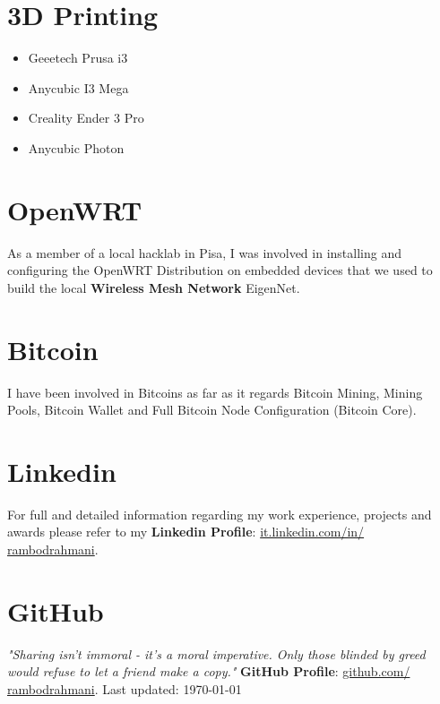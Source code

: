 \documentclass[]{friggeri-cv}
\begin{document}
\begin{aside}\vspace{-2.8cm}
\section{3D Printing \textcolor{red}{\faConnectdevelop}}
\begin{itemize}
	\item Geeetech Prusa i3
	\item Anycubic I3 Mega
	\item Creality Ender 3 Pro
	\item Anycubic Photon
\end{itemize}\vspace{6mm}
\section{OpenWRT \textcolor{green}{\faWifi}}
As a member of a local hacklab in Pisa, I was involved in installing and configuring the OpenWRT Distribution on embedded devices that we used to build the local \textbf{Wireless Mesh Network} EigenNet.\vspace{6mm}
\section{Bitcoin \textcolor{red}{\faBitcoin}}
I have been involved in Bitcoins as far as it regards Bitcoin Mining, Mining Pools, Bitcoin Wallet and Full Bitcoin Node Configuration (Bitcoin Core).\vspace{6mm}
\section{Linkedin \textcolor{blue}{\faLinkedinSquare}}
For full and detailed information regarding my work experience, projects and
awards please refer to my \textbf{Linkedin Profile}:
\href{http://it.linkedin.com/in/rambodrahmani}{{it.linkedin.com/in/}}\\\href{http://it.linkedin.com/in/rambodrahmani}{{rambodrahmani}}.\vspace{6mm}
\section{GitHub \textcolor{teal}{\faGithub}}
\emph{"Sharing isn't immoral - it's a moral imperative. Only those blinded by
greed would refuse to let a friend make a copy."}\vspace{1mm}
\textbf{GitHub Profile}: \href{http://github.com/rambodrahmani}{{github.com/}}\\\href{http://github.com/rambodrahmani}{{rambodrahmani}}.\vspace{10mm}
\small{Last updated: \today\ }
\end{aside}
\end{document}
